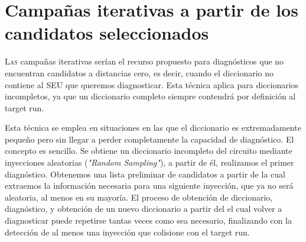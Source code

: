 \chapter{Campañas iterativas a partir de los candidatos seleccionados}
\label{ch:CampanasIterativas}

\lettrine[lraise=-0.1, lines=2, loversize=0.2]{L}{as} campañas iterativas serían
el recurso propuesto para diagnósticos que no encuentran candidatos a distancias
cero, es decir, cuando el diccionario no contiene al \gls{SEU} que queremos
diagnosticar. Esta técnica aplica para diccionarios incompletos, ya que un
diccionario completo siempre contendrá por definición al target run.

Esta técnica se emplea en situaciones en las que el diccionario es extremadamente 
pequeño pero sin llegar a perder completamente la capacidad de diagnóstico. El
concepto es sencillo. Se obtiene un diccionario incompleto del circuito mediante
inyecciones aleatorias (\textit{"Random Sampling"}), a partir de él, realizamos el
primer diagnóstico. Obtenemos una lista preliminar de candidatos a partir de la
cual extraemos la información necesaria para una siguiente inyección, que ya no 
será aleatoria, al menos en su mayoría. El proceso de obtención de diccionario,
diagnóstico, y obtención de un nuevo diccionario a partir del el cual volver a
diagnosticar puede repetirse tantas veces como sea necesario, finalizando con la
detección de al menos una inyección que colisione con el target run.


